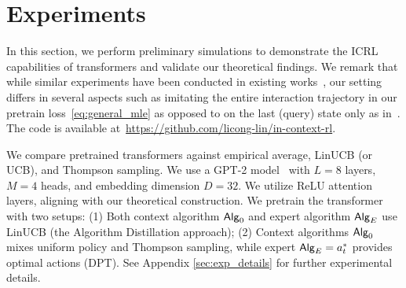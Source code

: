 \section{Experiments}
\label{sec:experiments}




In this section, we perform preliminary simulations to demonstrate the ICRL capabilities of transformers and validate our theoretical findings. We remark that while similar experiments have been conducted in existing works~\citep{laskin2022context,lee2023supervised}, our setting differs in several aspects such as imitating the entire interaction trajectory in our pretrain loss~\eqref{eq:general_mle} as opposed to on the last (query) state only as in~\citet{lee2023supervised}. The code is available at~\href{https://github.com/licong-lin/in-context-rl}{https://github.com/licong-lin/in-context-rl}.




We compare pretrained transformers against empirical average, LinUCB (or UCB), and Thompson sampling. We use a GPT-2 model~\cite{garg2022can,lee2023supervised} with $L = 8$ layers, $M=4$ heads, and embedding dimension $D=32$. We utilize ReLU attention layers, aligning with our theoretical construction. We pretrain the transformer with two setups: (1) Both context algorithm ${\mathsf{Alg}}_0$ and expert algorithm ${\mathsf{Alg}}_{{E}}$ use LinUCB (the Algorithm Distillation approach); (2) Context algorithms ${\mathsf{Alg}}_0$ mixes uniform policy and Thompson sampling, while expert ${\mathsf{Alg}}_{{E}} = {a}_t^*$ provides optimal actions (DPT). See Appendix \ref{sec:exp_details} for further experimental details. 



